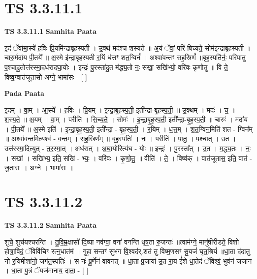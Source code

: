 \documentclass[17pt]{extarticle}
\begin{document}

\section{ TS 3.3.11.1 }

\textbf{TS 3.3.11.1 } \newline
\textbf{Samhita Paata} \newline

इ॒दं ॅवा॑मा॒स्ये॑ ह॒विः प्रि॒यमि॑न्द्राबृहस्पती । उ॒क्थं मद॑श्च शस्यते ॥ अ॒यं ॅवां॒ परि॑ षिच्यते॒ सोम॑इन्द्राबृहस्पती । चारु॒र्मदा॑य पी॒तये᳚ ॥ अ॒स्मे इ॑न्द्राबृहस्पती र॒यिं ध॑त्तꣳ शत॒ग्विनं᳚ । अश्वा॑वन्तꣳ सह॒स्रिणं᳚ ॥बृह॒स्पति॑र्नः॒ परि॑पातु प॒श्चादु॒तोत्त॑रस्मा॒दध॑रादघा॒योः । इन्द्रः॑ पु॒रस्ता॑दु॒त म॑द्ध्य॒तो नः॒ सखा॒ सखि॑भ्यो॒ वरि॑वः कृणोतु ॥ वि ते॒ विष्व॒ग्वात॑जूतासो अग्ने॒ भामा॑सः - [  ] \newline

\textbf{Pada Paata} \newline

इ॒दम् । वा॒म् । आ॒स्ये᳚ । ह॒विः । प्रि॒यम् । इ॒न्द्रा॒बृ॒ह॒स्प॒ती॒ इती᳚न्द्रा-बृ॒ह॒स्प॒ती॒ ॥ उ॒क्थम् । मदः॑ । च॒ । श॒स्य॒ते॒ ॥ अ॒यम् । वा॒म् । परीति॑ । सि॒च्य॒ते॒ । सोमः॑ । इ॒न्द्रा॒बृ॒ह॒स्प॒ती॒ इती᳚न्द्रा-बृ॒ह॒स्प॒ती॒ ॥ चारुः॑ । मदा॑य । पी॒तये᳚ ॥ अ॒स्मे इति॑ । इ॒न्द्रा॒बृ॒ह॒स्प॒ती॒ इती᳚न्द्रा - बृ॒ह॒स्प॒ती॒ । र॒यिम् । ध॒त्त॒म् । श॒त॒ग्विन॒मिति॑ शत - ग्विन᳚म् ॥ अश्वा॑वन्त॒मित्यश्व॑ - व॒न्त॒म् । स॒ह॒स्रिण᳚म् ॥ बृह॒स्पतिः॑ । नः॒ । परीति॑ । पा॒तु॒ । प॒श्चात् । उ॒त । उत्त॑रस्मा॒दित्युत् - त॒र॒स्मा॒त् । अध॑रात् । अ॒घा॒योरित्य॑घ - योः ॥ इन्द्रः॑ । पु॒रस्ता᳚त् । उ॒त । म॒द्ध्य॒तः । नः॒ । सखा᳚ । सखि॑भ्य॒ इति॒ सखि॑ - भ्यः॒ । वरि॑वः । कृ॒णो॒तु॒ ॥ वीति॑ । ते॒ । विष्व॑क् । वात॑जूतास॒ इति॒ वात॑ - जू॒ता॒सः॒ । अ॒ग्ने॒ । भामा॑सः ।  \newline





\section{ TS 3.3.11.2 }

\textbf{TS 3.3.11.2 } \newline
\textbf{Samhita Paata} \newline

शुचे॒ शुच॑यश्चरन्ति । तु॒वि॒म्र॒क्षासो॑ दि॒व्या नव॑ग्वा॒ वना॑ वनन्ति धृष॒ता रु॒जन्तः॑ ॥त्वाम॑ग्ने॒ मानु॑षीरीडते॒ विशो॑ होत्रा॒विदं॒ ॅविवि॑चिꣳ रत्न॒धात॑मं । गुहा॒ सन्तꣳ॑ सुभग वि॒श्वद॑र्.शतं तु विष्म॒णसꣳ॑ सु॒यजं॑ घृत॒श्रियं᳚ ॥धा॒ता द॑दातु नो र॒यिमीशा॑नो॒ जग॑त॒स्पतिः॑ । स नः॑ पू॒र्णेन॑ वावनत् ॥ धा॒ता प्र॒जाया॑ उ॒त रा॒य ई॑शे धा॒तेदं ॅविश्वं॒ भुव॑नं जजान । धा॒ता पु॒त्रं ॅयज॑मानाय॒ दाता॒ - [  ] \newline
\end{document}
